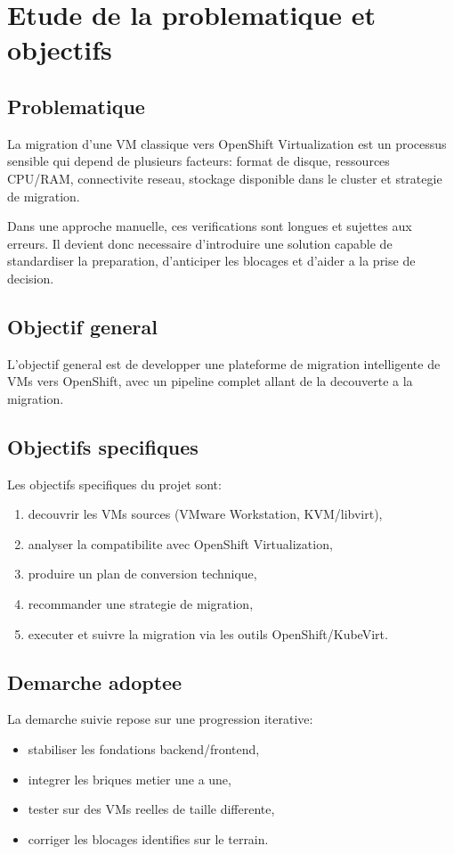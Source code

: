 ﻿\chapter{Etude de la problematique et objectifs}

\section{Problematique}
La migration d'une VM classique vers OpenShift Virtualization est un processus sensible qui depend de plusieurs facteurs: format de disque, ressources CPU/RAM, connectivite reseau, stockage disponible dans le cluster et strategie de migration.

Dans une approche manuelle, ces verifications sont longues et sujettes aux erreurs. Il devient donc necessaire d'introduire une solution capable de standardiser la preparation, d'anticiper les blocages et d'aider a la prise de decision.

\section{Objectif general}
L'objectif general est de developper une plateforme de migration intelligente de VMs vers OpenShift, avec un pipeline complet allant de la decouverte a la migration.

\section{Objectifs specifiques}
Les objectifs specifiques du projet sont:
\begin{enumerate}[leftmargin=1.2cm]
  \item decouvrir les VMs sources (VMware Workstation, KVM/libvirt),
  \item analyser la compatibilite avec OpenShift Virtualization,
  \item produire un plan de conversion technique,
  \item recommander une strategie de migration,
  \item executer et suivre la migration via les outils OpenShift/KubeVirt.
\end{enumerate}

\section{Demarche adoptee}
La demarche suivie repose sur une progression iterative:
\begin{itemize}[leftmargin=1.2cm]
  \item stabiliser les fondations backend/frontend,
  \item integrer les briques metier une a une,
  \item tester sur des VMs reelles de taille differente,
  \item corriger les blocages identifies sur le terrain.
\end{itemize}
